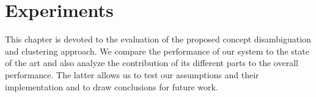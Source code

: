 \chapter{Experiments}
\label{chapt:exp}

This chapter is devoted to the evaluation of the proposed concept
disambiguation and clustering approach. We compare the performance of
our system to the state of the art and also analyze the contribution
of its different parts to the overall performance. The latter allows
us to test our assumptions and their implementation and to draw
conclusions for future work.
